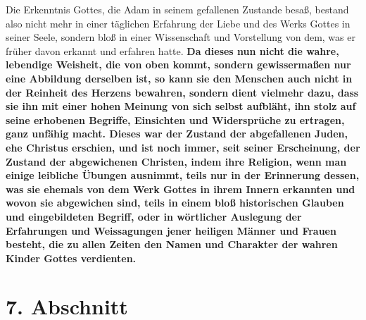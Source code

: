 \label{ref:07_06_wissenschaft}
Die Erkenntnis Gottes, die Adam in seinem gefallenen Zustande besaß, bestand
also nicht mehr in einer täglichen Erfahrung der Liebe und des Werks Gottes in
seiner Seele, sondern bloß in einer Wissenschaft
und Vorstellung von dem, was er
früher davon erkannt und erfahren hatte. \textbf{Da dieses nun nicht die wahre,
lebendige Weisheit, die von oben
kommt, sondern gewissermaßen nur eine Abbildung
derselben ist, so kann sie den Menschen auch nicht in der Reinheit des Herzens
bewahren, sondern dient vielmehr dazu, dass sie ihn mit einer hohen Meinung von
sich selbst aufbläht, ihn stolz auf seine erhobenen Begriffe,
Einsichten und Widersprüche zu ertragen, ganz
unfähig macht. Dieses war der Zustand der
abgefallenen Juden, ehe Christus erschien,
und ist noch immer, seit seiner
Erscheinung, der Zustand der abgewichenen
Christen, indem ihre Religion, wenn
man einige leibliche Übungen ausnimmt, teils nur in der Erinnerung dessen, was
sie ehemals von dem Werk Gottes in ihrem Innern erkannten und wovon sie
abgewichen sind, teils in einem bloß historischen Glauben und eingebildeten
Begriff, oder in wörtlicher Auslegung
 der Erfahrungen und Weissagungen jener
heiligen Männer und Frauen besteht, die zu allen Zeiten den Namen und Charakter
der wahren Kinder Gottes verdienten.}

\section{7. Abschnitt} \label{kap7_ab7}

